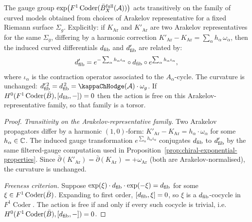 \begin{theorem}
\label{thm:gauge-torsor}
The gauge group
$\exp\bigl(F^1 \operatorname{Coder}(\bar B_X^{\mathrm{full}}(\mathcal{A}))\bigr)$
acts transitively on the family of curved models obtained from
choices of Arakelov representative for a fixed Riemann surface
$\Sigma_g$.
Explicitly: if $K_{\mathrm{Ar}}$ and $K'_{\mathrm{Ar}}$ are two
Arakelov representatives for the same $\Sigma_g$, differing by a
harmonic correction
$K'_{\mathrm{Ar}} - K_{\mathrm{Ar}} = \sum_\alpha h_\alpha\,\omega_\alpha$,
then the induced curved differentials
$d_{\mathrm{fib}}$ and $d_{\mathrm{fib}}'$ are related by:
\[
d_{\mathrm{fib}}' = e^{-\sum_\alpha h_\alpha \iota_\alpha}
\circ d_{\mathrm{fib}} \circ
e^{\sum_\alpha h_\alpha \iota_\alpha},
\]
where $\iota_\alpha$ is the contraction operator associated to the
$A_\alpha$-cycle.
The curvature is unchanged:
$\dfib'^{\,2} = \dfib^{\,2} = \kappaChHodge(\cA) \cdot \omega_g$.
If $H^0(F^1\operatorname{Coder}(\bar{B}), [d_{\mathrm{fib}}, -]) = 0$
then the action is free on this Arakelov-representative family, so
that family is a torsor.
\end{theorem}

\begin{proof}
\emph{Transitivity on the Arakelov-representative family.}
Two Arakelov propagators differ by a harmonic $(1,0)$-form:
$K'_{\mathrm{Ar}} - K_{\mathrm{Ar}} = h_\alpha \cdot \omega_\alpha$
for some $h_\alpha \in \mathbb{C}$. The induced gauge transformation
$e^{\sum_\alpha h_\alpha \iota_\alpha}$ conjugates $d_{\mathrm{fib}}$ to $d_{\mathrm{fib}}'$
by the same filtered-gauge computation used in
Proposition~\ref{prop:chiral-exponential-properties}.
Since $\bar\partial(K'_{\mathrm{Ar}}) = \bar\partial(K_{\mathrm{Ar}})
= +\omega_{\mathrm{Ar}}$ (both are Arakelov-normalised),
the curvature is unchanged.

\emph{Freeness criterion.}
Suppose $\exp(\xi) \cdot d_{\mathrm{fib}} \cdot \exp(-\xi) = d_{\mathrm{fib}}$
for some $\xi \in F^1\operatorname{Coder}(\bar{B})$.
Expanding to first order, $[d_{\mathrm{fib}}, \xi] = 0$,
so $\xi$ is a $d_{\mathrm{fib}}$-cocycle in $F^1\operatorname{Coder}$.
The action is free if and only if every such cocycle
is trivial, i.e.\
$H^0(F^1\operatorname{Coder}(\bar{B}), [d_{\mathrm{fib}}, -]) = 0$.
\end{proof}

